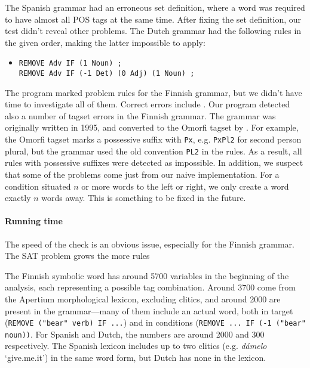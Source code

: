The Spanish grammar had an erroneous set definition, where a word was required to have almost all POS tags at the same time. After fixing the set definition, our test didn't reveal other problems.
The Dutch grammar had the following rules in the given order, making the latter impossible to apply:
\begin{itemize}
\item[] 
\begin{verbatim}REMOVE Adv IF (1 Noun) ;
REMOVE Adv IF (-1 Det) (0 Adj) (1 Noun) ;
\end{verbatim}
\end{itemize}

The program marked  problem rules for the Finnish grammar, but we didn't have time to investigate all of them.
Correct errors include .
Our program detected also a number of tagset errors in the Finnish grammar.
The grammar was originally written in 1995, and converted to the Omorfi tagset by \cite{pirinen2015}. 
For example, the Omorfi tagset marks a possessive suffix with \texttt{Px}, e.g. \texttt{PxPl2} for second person plural, but the grammar used the old convention \texttt{PL2} in the rules.
As a result, all rules with possessive suffixes were detected as impossible.
In addition, we suspect that some of the problems come just from our naive implementation.
For a condition situated $n$ or more words to the left or right, we only create a word exactly $n$ words away. This is something to be fixed in the future.

\paragraph{Running time} The speed of the check is an obvious issue, especially for the Finnish grammar. The SAT problem grows the more rules 


The Finnish symbolic word has around 5700 variables in the beginning of the analysis, each representing a possible tag combination.
Around 3700 come from the Apertium morphological lexicon, excluding clitics, and around 2000 are present in the grammar---many of them include an actual word, both in target (\texttt{REMOVE ("bear" verb) IF ...}) and in conditions (\texttt{REMOVE ... IF (-1 ("bear" noun))}.
For Spanish and Dutch, the numbers are around 2000 and 300 respectively.
The Spanish lexicon includes up to two clitics (e.g. \emph{dámelo} `give.me.it') in the same word form, but Dutch has none in the lexicon.

